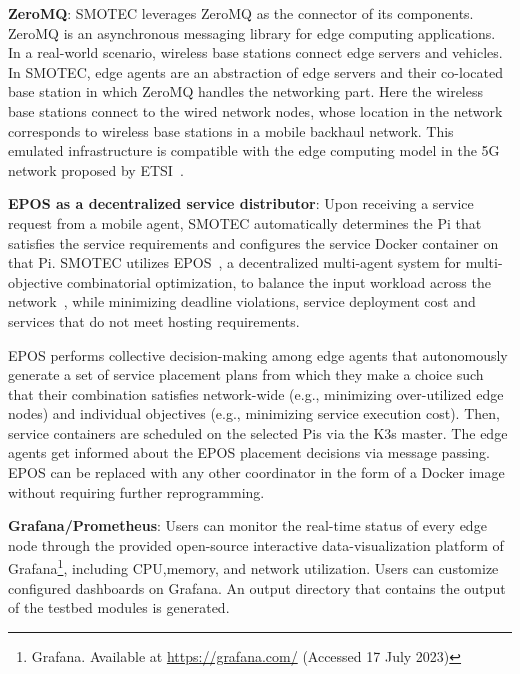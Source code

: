 \documentclass[conference]{IEEEtran}
\begin{document}
\noindent \textbf{ZeroMQ}: SMOTEC leverages ZeroMQ as the connector of its components. ZeroMQ is an asynchronous messaging library for edge computing applications. In a real-world scenario, wireless base stations connect edge servers and vehicles. In SMOTEC, edge agents are an abstraction of edge servers and their co-located base station in which ZeroMQ handles the networking part. Here the wireless base stations connect to the wired network nodes, whose location in the network corresponds to wireless base stations in a mobile backhaul network. This emulated infrastructure is compatible with the edge computing model in the 5G network proposed by ETSI~\cite{etsi2018white}. 

\noindent \textbf{EPOS as a decentralized service distributor}: Upon receiving a service request from a mobile agent, SMOTEC automatically determines the Pi that satisfies the service requirements and configures the service Docker container on that Pi. SMOTEC utilizes EPOS~\cite{pournaras2018decentralized,pournaras2020collective}, a decentralized multi-agent system for multi-objective combinatorial optimization, to balance the input workload across the network~\cite{Nezami2021},
while minimizing deadline violations, service deployment cost and services that do not meet hosting requirements. 

\par EPOS performs collective decision-making among edge agents that autonomously generate a set of service placement plans from which they make a choice such that their combination satisfies network-wide (e.g., minimizing over-utilized edge nodes) and individual objectives (e.g., minimizing service execution cost). Then, service containers are scheduled on the selected Pis via the K3s master. The edge agents get informed about the EPOS placement decisions via message passing. EPOS can be replaced with any other coordinator in the form of a Docker image without requiring further reprogramming.

\noindent \textbf{Grafana/Prometheus}: Users can monitor the real-time status of every edge node through the provided open-source interactive data-visualization platform of Grafana\footnote{Grafana. Available at \url{https://grafana.com/} (Accessed 17 July 2023)}, including CPU,memory, and network utilization. Users can customize configured dashboards on Grafana. An output directory that contains the output of the testbed modules is generated.
\end{document}
